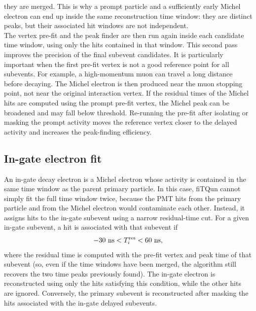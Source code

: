 \documentclass{article}
\numberwithin{table}{subsection}
\numberwithin{figure}{subsection}
\numberwithin{equation}{subsection}
\numberwithin{footnote}{subsection}
\begin{document}
they are merged. This is why a prompt particle and a sufficiently early
Michel electron can end up inside the same reconstruction time window: they
are distinct peaks, but their associated hit windows are not independent.\\
The vertex pre-fit and the peak finder are then run again inside each
candidate time window, using only the hits contained in that window. This
second pass improves the precision of the final subevent candidates. It is
particularly important when the first pre-fit vertex is not a good reference
point for all subevents. For example, a high-momentum muon can travel a long
distance before decaying. The Michel electron is then produced near the muon
stopping point, not near the original interaction vertex. If the residual
times of the Michel hits are computed using the prompt pre-fit vertex, the
Michel peak can be broadened and may fall below threshold. Re-running the
pre-fit after isolating or masking the prompt activity moves the reference
vertex closer to the delayed activity and increases the peak-finding
efficiency.
\subsection{In-gate electron fit}
An in-gate
decay electron is a Michel electron whose activity is contained in the same
time window as the parent primary particle. In this case, fiTQun cannot
simply fit the full time window twice, because the PMT hits from the primary
particle and from the Michel electron would contaminate each other. Instead,
it assigns hits to the in-gate subevent using a narrow residual-time cut.
For a given in-gate subevent, a hit is associated with that subevent if
\[
  -30~{\rm ns}
  <
  T_i^{\rm res}
  <
  60~{\rm ns},
\]
where the residual time is computed with the pre-fit vertex and peak time of
that subevent (so, even if the time windows have been merged, the algorithm still recovers the two time peaks previously found). The in-gate electron is reconstructed using only the hits
satisfying this condition, while the other hits are ignored. Conversely, the
primary subevent is reconstructed after masking the hits associated with the
in-gate delayed subevents.
\end{document}

